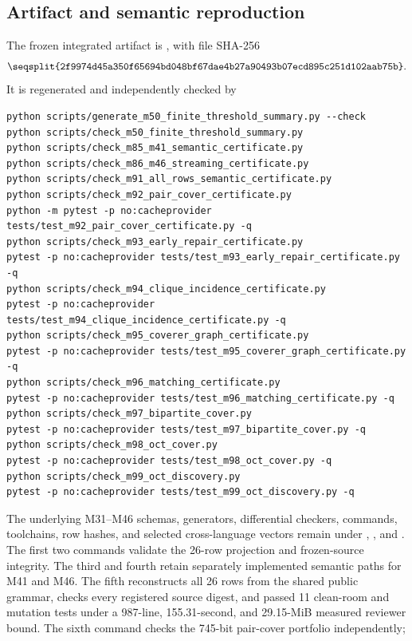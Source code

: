 \documentclass[11pt]{article}
\begin{document}


\subsection{Artifact and semantic reproduction}

The frozen integrated artifact is
, with file SHA-256
\[
\texttt{\seqsplit{2f9974d45a350f65694bd048bf67dae4b27a90493b07ecd895c251d102aab75b}}.
\]
It is regenerated and independently checked by
\begin{verbatim}
python scripts/generate_m50_finite_threshold_summary.py --check
python scripts/check_m50_finite_threshold_summary.py
python scripts/check_m85_m41_semantic_certificate.py
python scripts/check_m86_m46_streaming_certificate.py
python scripts/check_m91_all_rows_semantic_certificate.py
python scripts/check_m92_pair_cover_certificate.py
python -m pytest -p no:cacheprovider tests/test_m92_pair_cover_certificate.py -q
python scripts/check_m93_early_repair_certificate.py
pytest -p no:cacheprovider tests/test_m93_early_repair_certificate.py -q
python scripts/check_m94_clique_incidence_certificate.py
pytest -p no:cacheprovider tests/test_m94_clique_incidence_certificate.py -q
python scripts/check_m95_coverer_graph_certificate.py
pytest -p no:cacheprovider tests/test_m95_coverer_graph_certificate.py -q
python scripts/check_m96_matching_certificate.py
pytest -p no:cacheprovider tests/test_m96_matching_certificate.py -q
python scripts/check_m97_bipartite_cover.py
pytest -p no:cacheprovider tests/test_m97_bipartite_cover.py -q
python scripts/check_m98_oct_cover.py
pytest -p no:cacheprovider tests/test_m98_oct_cover.py -q
python scripts/check_m99_oct_discovery.py
pytest -p no:cacheprovider tests/test_m99_oct_discovery.py -q
\end{verbatim}
The underlying M31--M46 schemas, generators, differential checkers, commands,
toolchains, row hashes, and selected cross-language vectors remain under
, , and .
The first two commands validate the 26-row projection and frozen-source
integrity.  The third and fourth retain separately implemented semantic
paths for M41 and M46.  The fifth reconstructs all 26 rows from the shared
public grammar, checks every registered source digest, and passed 11
clean-room and mutation tests under a 987-line, 155.31-second, and
29.15-MiB measured reviewer bound.
The sixth command checks the 745-bit pair-cover portfolio independently;
\end{document}
